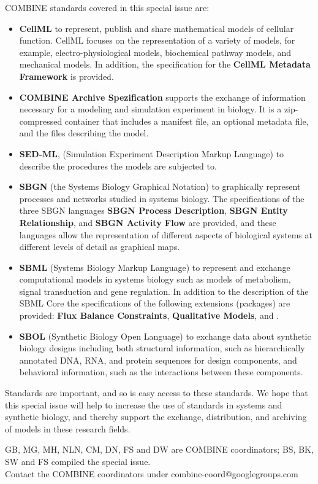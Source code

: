 \documentclass{jib}
\begin{document}
COMBINE standards covered in this special issue are:
\begin{itemize}
\item {\bf CellML} to represent, publish and share mathematical models of cellular function. CellML focuses on the representation of a variety of models, for example, electro-physiological models, biochemical pathway models, and mechanical models. In addition, the specification for the {\bf CellML Metadata Framework} is provided.

\item {\bf COMBINE Archive Spezification} supports the exchange of information necessary for a modeling and simulation experiment in biology. It is a zip-compressed container that includes a manifest file, an optional metadata file, and the files describing the model. 

\item {\bf SED-ML}, (Simulation Experiment Description Markup Language) to describe the procedures the models are subjected to.

\item {\bf SBGN} (the Systems Biology Graphical Notation) to graphically represent processes and networks studied in systems biology. The specifications of the three SBGN languages {\bf SBGN Process Description}, {\bf SBGN Entity Relationship}, and {\bf SBGN Activity Flow} are provided, and these languages allow the representation of different aspects of biological systems at different levels of detail as  graphical maps.

\item {\bf SBML} (Systems Biology Markup Language) to represent and exchange computational models in systems biology such as models of metabolism, signal transduction and gene regulation. In addition to the description of the SBML Core the specifications of the following extensions (packages) are provided:  {\bf Flux Balance Constraints}, {\bf Qualitative Models}, and {\bf }.

\item {\bf SBOL} (Synthetic Biology Open Language) to exchange data about synthetic biology designs including both structural information, such as hierarchically annotated DNA, RNA, and protein sequences for design components, and behavioral information, such as the interactions between these components. 
\end{itemize}

Standards are important, and so is easy access to these standards. We hope that this special issue will help to increase the use of standards in systems and synthetic biology, and thereby support the exchange, distribution, and archiving  of models in these research fields.

\vspace*{1.5cm}

GB, MG, MH, NLN, CM, DN, FS and DW are COMBINE coordinators; BS, BK, SW and FS compiled the special issue. \\
Contact the COMBINE coordinators under combine-coord@googlegroups.com



\end{document}
